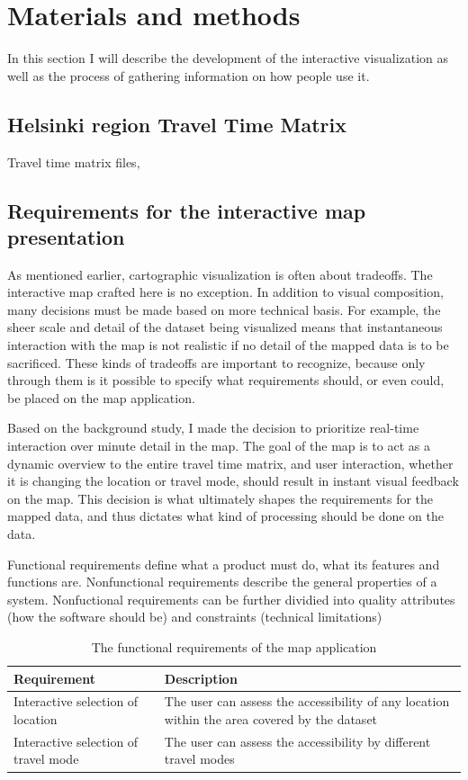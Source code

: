 \section{Materials and methods}
In this section I will describe the development of the interactive visualization
as well as the process of gathering information on how people use it.

\subsection{Helsinki region Travel Time Matrix}
Travel time matrix files,

\subsection{Requirements for the interactive map presentation}

As mentioned earlier, cartographic visualization is often about tradeoffs.
The interactive map crafted here is no exception.
In addition to visual composition,  %
many decisions must be made based on more technical basis.
For example, the sheer scale and detail of the dataset being visualized
means that instantaneous interaction with the map is not realistic
if no detail of the mapped data is to be sacrificed.
These kinds of tradeoffs are important to recognize,
because only through them is it possible to specify what
requirements should, or even could, be placed on the map application.

Based on the background study,  %
I made the decision to prioritize real-time interaction over minute detail in the map.
The goal of the map is to act as a dynamic overview to the entire travel time matrix,
and user interaction, whether it is changing the location or travel mode,
should result in instant visual feedback on the map.
This decision is what ultimately shapes the requirements for the mapped data,
and thus dictates what kind of processing should be done on the data.

Functional requirements define what a product must do,
what its features and functions are.
Nonfunctional requirements describe the general properties of a system.
Nonfuctional requirements can be further dividied into quality attributes
(how the software should be) and constraints (technical limitations)

\begin{table}[h]
	\centering
	\begin{tabular}{ | L{0.3\textwidth} | L{0.6\textwidth} | }
		\hline
		Requirement
		& Description
		\\
		\hline
		\hline
		Interactive selection of location
		& The user can assess the accessibility of any location within the area covered by the dataset
		\\
		\hline
		Interactive selection of travel mode
		& The user can assess the accessibility by different travel modes
		\\
		\hline
	\end{tabular}
	\caption{The functional requirements of the map application}
	\label{tab:functional requirements}
\end{table}

